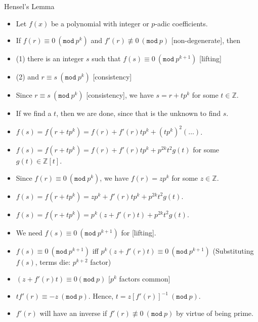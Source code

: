 \documentclass[8pt]{beamer}
\renewcommand{\mod}[1]{\left( \texttt{mod}~#1 \right)}
\newcommand{\Z}{\mathbb Z}
\begin{document}
\begin{frame}{Hensel's Lemma}
\begin{theorem}
\begin{itemize}
\item Let $f(x)$ be a polynomial with integer or $p$-adic coefficients.
\item If $f(r) \equiv 0 ~\mod{p^k}$ and $f'(r) \not \equiv 0 ~\mod{p}$ [non-degenerate], then
\item (1) there is an integer $s$ such that $f(s) \equiv 0 ~\mod{p^{k+1}}$ [lifting]
\item (2) and $r \equiv s~\mod{p^k}$ [consistency]
\end{itemize}
\end{theorem}

{\footnotesize
\begin{itemize}
\item Since $r \equiv s~\mod{p^k}$ [consistency], we have $s =  r + tp^k$ for some $t \in \Z$.\pause
\item If we find a $t$, then we are done, since that is the unknown to find $s$. \pause
\item $f(s) = f(r + tp^k) = f(r) + f'(r) tp^k + (tp^k)^2(\dots)$.\pause
\item $f(s) = f(r + tp^k) = f(r) + f'(r) tp^k + p^{2k}t^2 g(t)$ for some $g(t) \in \Z[t]$.\pause
\item Since $f(r) \equiv 0~\mod{p^k}$, we have $f(r) = zp^k$ for some $z \in \Z$.\pause
\item $f(s) = f(r + tp^k) = zp^k + f'(r) tp^k +  p^{2k}t^2 g(t)$.\pause
\item $f(s) = f(r + tp^k) = p^k(z + f'(r) t) +  p^{2k}t^2 g(t)$.\pause
\item We need $f(s) \equiv 0 ~\mod{p^{k+1}}$  for [lifting].
\item $f(s) \equiv 0 ~\mod{p^{k+1}}$ iff $p^k(z + f'(r) t) \equiv 0 ~\mod{p^{k+1}}$ (Substituting $f(s)$, terms die: $p^{k+2}$ factor)\pause
\item $(z + f'(r)t) \equiv 0 \mod{p}$ [$p^k$ factors common]
\item $tf'(r) \equiv -z ~\mod{p}$. Hence, $t = z[f'(r)]^{-1}~ \mod{p}$.
\item $f'(r)$ will have an inverse  if $f'(r) \not \equiv 0 ~\mod{p}$ by virtue
      of being prime.
\end{itemize}
}
\end{frame}
\end{document}
